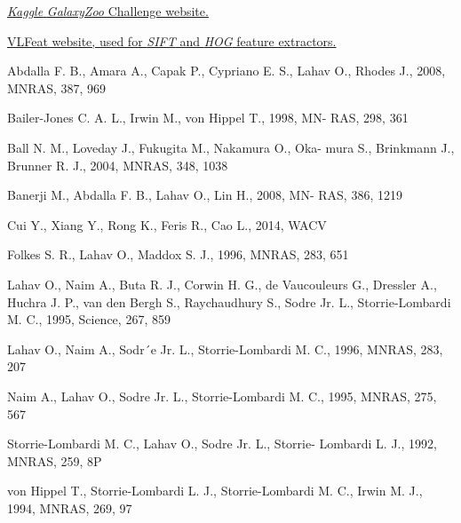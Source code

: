 \documentclass{vldb}
\begin{document}
\begin{thebibliography}{9}
\vspace{0.25cm}

\href{http://www.kaggle.com/c/galaxy-zoo-the-galaxy-challenge}{\emph{Kaggle} \emph{GalaxyZoo} Challenge website.}

\href{www.vlfeat.org}{VLFeat website, used for \emph{SIFT} and \emph{HOG} feature extractors.}

Abdalla F. B., Amara A., Capak P., Cypriano E. S., Lahav
O., Rhodes J., 2008, MNRAS, 387, 969

Bailer-Jones C. A. L., Irwin M., von Hippel T., 1998, MN-
RAS, 298, 361

Ball N. M., Loveday J., Fukugita M., Nakamura O., Oka-
mura S., Brinkmann J., Brunner R. J., 2004, MNRAS,
348, 1038

Banerji M., Abdalla F. B., Lahav O., Lin H., 2008, MN-
RAS, 386, 1219

Cui Y., Xiang Y., Rong K., Feris R., Cao L., 2014, WACV

Folkes S. R., Lahav O., Maddox S. J., 1996, MNRAS, 283,
651

Lahav O., Naim A., Buta R. J., Corwin H. G., de Vaucouleurs G., Dressler A., Huchra J. P., van den Bergh S., Raychaudhury S., Sodre Jr. L., Storrie-Lombardi M. C., 1995, Science, 267, 859

Lahav O., Naim A., Sodr´e Jr. L., Storrie-Lombardi M. C., 1996, MNRAS, 283, 207 

Naim A., Lahav O., Sodre Jr. L., Storrie-Lombardi M. C.,
1995, MNRAS, 275, 567

Storrie-Lombardi M. C., Lahav O., Sodre Jr. L., Storrie-
Lombardi L. J., 1992, MNRAS, 259, 8P

von Hippel T., Storrie-Lombardi L. J., Storrie-Lombardi
M. C., Irwin M. J., 1994, MNRAS, 269, 97

\end{thebibliography}


\end{document}
